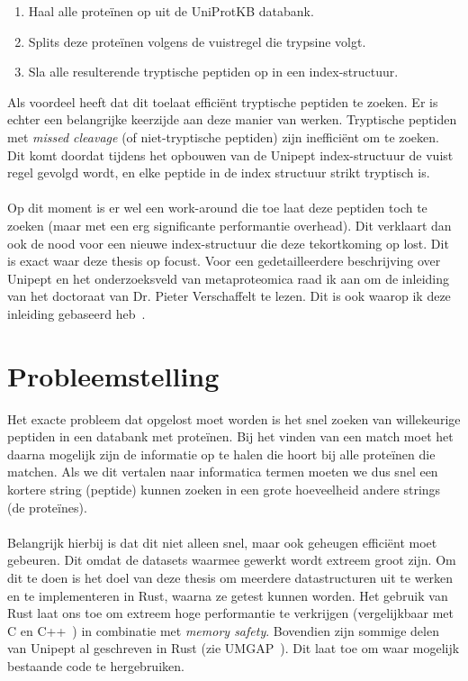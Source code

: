\documentclass[11pt,dutch,faculty=we,layout=titlefont,underline=false,titleUppercase=true,titleUnderline=true]{ugent2016-report}
\begin{document}
    \begin{enumerate}
        \item Haal alle proteïnen op uit de UniProtKB databank.
        \item Splits deze proteïnen volgens de vuistregel die trypsine volgt.
        \item Sla alle resulterende tryptische peptiden op in een index-structuur.
    \end{enumerate}

    Als voordeel heeft dat dit toelaat efficiënt tryptische peptiden te zoeken.
    Er is echter een belangrijke keerzijde aan deze manier van werken.
    Tryptische peptiden met \textit{missed cleavage} (of niet-tryptische peptiden) zijn inefficiënt om te zoeken.
    Dit komt doordat tijdens het opbouwen van de Unipept index-structuur de vuist regel gevolgd wordt, en elke peptide in de index structuur strikt tryptisch is.
    \\ \\
    Op dit moment is er wel een work-around die toe laat deze peptiden toch te zoeken (maar met een erg significante performantie overhead).
    Dit verklaart dan ook de nood voor een nieuwe index-structuur die deze tekortkoming op lost.
    Dit is exact waar deze thesis op focust.
    \newline
    Voor een gedetailleerdere beschrijving over Unipept en het onderzoeksveld van metaproteomica raad ik aan om de inleiding van het doctoraat van Dr. Pieter Verschaffelt te lezen.
    Dit is ook waarop ik deze inleiding gebaseerd heb~\cite{phdPieterUnipept}.


    \section{Probleemstelling}\label{sec:probleemstelling}
    Het exacte probleem dat opgelost moet worden is het snel zoeken van willekeurige peptiden in een databank met proteïnen.
    Bij het vinden van een match moet het daarna mogelijk zijn de informatie op te halen die hoort bij alle proteïnen die matchen.
    Als we dit vertalen naar informatica termen moeten we dus snel een kortere string (peptide) kunnen zoeken in een grote hoeveelheid andere strings (de proteïnes).
    \\ \\
    Belangrijk hierbij is dat dit niet alleen snel, maar ook geheugen efficiënt moet gebeuren.
    Dit omdat de datasets waarmee gewerkt wordt extreem groot zijn.
    Om dit te doen is het doel van deze thesis om meerdere datastructuren uit te werken en te implementeren in Rust, waarna ze getest kunnen worden.
    Het gebruik van Rust laat ons toe om extreem hoge performantie te verkrijgen (vergelijkbaar met C en C++~\cite{rustPerformantie}) in combinatie met \textit{memory safety}.
    Bovendien zijn sommige delen van Unipept al geschreven in Rust (zie UMGAP~\cite{UMGAP_paper, UMGAP_source}).
    Dit laat toe om waar mogelijk bestaande code te hergebruiken.
\end{document}
